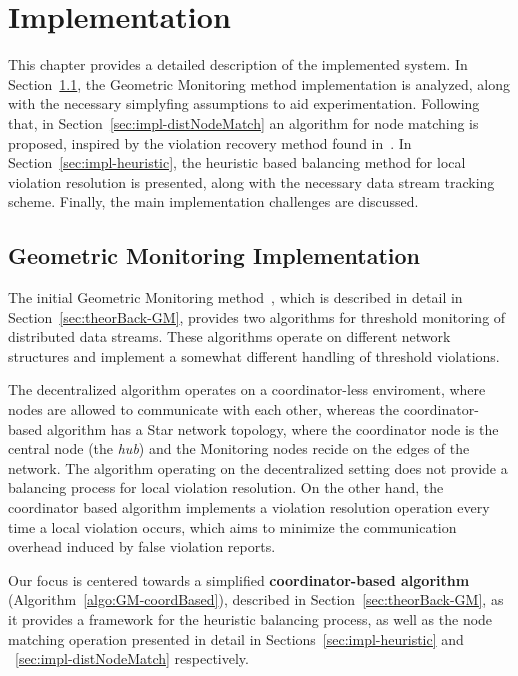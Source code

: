 \chapter{Implementation} \label{chap:impl}

This chapter provides a detailed description of the implemented system. In Section~\ref{sec:impl-GM}, the Geometric Monitoring method implementation is analyzed, along with the necessary simplyfing assumptions to aid experimentation. Following that, in Section~\ref{sec:impl-distNodeMatch} an algorithm for node matching is proposed, inspired by the violation recovery method found in~\cite{Keren2014GMHetStreams}. In Section~\ref{sec:impl-heuristic}, the heuristic based balancing method for local violation resolution is presented, along with the necessary data stream tracking scheme. Finally, the main implementation challenges are discussed.

\section{Geometric Monitoring Implementation} \label{sec:impl-GM}

The initial Geometric Monitoring method~\cite{Sharfman2006GM}, which is described in detail in Section~\ref{sec:theorBack-GM}, provides two algorithms for threshold monitoring of distributed data streams. These algorithms operate on different network structures and implement a somewhat different handling of threshold violations.

The decentralized algorithm operates on a coordinator-less enviroment, where nodes are allowed to communicate with each other, whereas the coordinator-based algorithm has a Star network topology, where the coordinator node is the central node (the \emph{hub}) and the Monitoring nodes recide on the edges of the network.
The algorithm operating on the decentralized setting does not provide a balancing process for local violation resolution. On the other hand, the coordinator based algorithm implements a violation resolution operation every time a local violation occurs, which aims to minimize the communication overhead induced by false violation reports. 

Our focus is centered towards a simplified \textbf{coordinator-based algorithm} (Algorithm~\ref{algo:GM-coordBased}), described in Section~\ref{sec:theorBack-GM}, as it provides a framework for the heuristic balancing process, as well as the node matching operation presented in detail in Sections~\ref{sec:impl-heuristic} and ~\ref{sec:impl-distNodeMatch} respectively.


